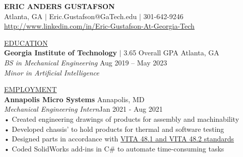 \documentclass{article}
\begin{document}
\title{}
\author{}
\date{}
\maketitle

\thispagestyle{empty} %


\begin{center}\textbf{\Huge ERIC ANDERS GUSTAFSON}\\
\large\linkcolor Atlanta, GA  $|$ {\color{blue} Eric.Gustafson@GaTech.edu} $|$  301-642-9246\\
\linkcolor\href{http://www.linkedin.com/in/Eric-Gustafson-At-Georgia-Tech}{http://www.linkedin.com/in/Eric-Gustafson-At-Georgia-Tech}\\
\end{center}

\underline{\Large E\normalsize DUCATION\qquad\qquad\qquad\qquad\qquad\qquad\qquad\qquad\qquad\qquad\qquad\qquad\qquad\qquad\qquad\qquad\qquad\qquad\qquad\qquad\quad}\\
\large \textbf{Georgia Institute of Technology} $|$ 3.65 Overall GPA    \hfill Atlanta, GA\\
\large\textit{BS in Mechanical Engineering}     \hfill Aug 2019 – May 2023\\
\large\textit{Minor in Artificial Intelligence}\\

\vspace{5mm} %

\underline{\Large E\normalsize MPLOYMENT\qquad\qquad\qquad\qquad\qquad\qquad\qquad\qquad\qquad\qquad\qquad\qquad\qquad\qquad\qquad\qquad\qquad\qquad\qquad\quad}\\
\large\textbf{Annapolis Micro Systems} \hfill Annapolis, MD\\
\large\textit{Mechanical Engineering Intern}\hfill Jan 2021 - Aug 2021\\
\qquad • \quad Created engineering drawings of products for assembly and machinability\\
\qquad • \quad Developed chassis' to hold products for thermal and software testing \\
\qquad • \quad Designed parts in accordance with \linkcolor\href{https://www.vita.com/VITA-Announcements/9204245}{VITA 48.1 and VITA 48.2 standards} \\ %
\qquad • \quad Coded SolidWorks add-ins in C\# to automate time-consuming tasks\\
\vspace{5mm} %
\end{document}
